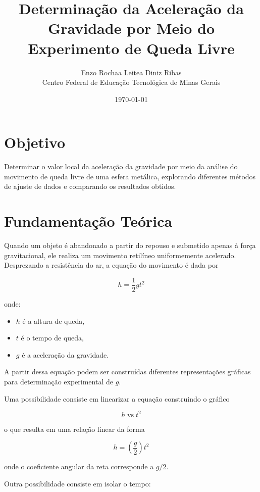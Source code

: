 \documentclass[12pt,a4paper]{article}
\title{Determinação da Aceleração da Gravidade por Meio do Experimento de Queda Livre}
\author{Enzo Rochaa Leitea Diniz Ribas \\ Centro Federal de Educação Tecnológica de Minas Gerais}
\date{\today}
\begin{document}
\maketitle

\section{Objetivo}

Determinar o valor local da aceleração da gravidade por meio da análise do movimento de queda livre de uma esfera metálica, explorando diferentes métodos de ajuste de dados e comparando os resultados obtidos.

\section{Fundamentação Teórica}

Quando um objeto é abandonado a partir do repouso e submetido apenas à força gravitacional, ele realiza um movimento retilíneo uniformemente acelerado. Desprezando a resistência do ar, a equação do movimento é dada por

\begin{equation}
h = \frac{1}{2}gt^2
\end{equation}

onde:

\begin{itemize}
\item $h$ é a altura de queda,
\item $t$ é o tempo de queda,
\item $g$ é a aceleração da gravidade.
\end{itemize}

A partir dessa equação podem ser construídas diferentes representações gráficas para determinação experimental de $g$.

Uma possibilidade consiste em linearizar a equação construindo o gráfico

\begin{equation}
h \; \text{vs} \; t^2
\end{equation}

o que resulta em uma relação linear da forma

\begin{equation}
h = \left(\frac{g}{2}\right)t^2
\end{equation}

onde o coeficiente angular da reta corresponde a $g/2$.

Outra possibilidade consiste em isolar o tempo:
\end{document}
